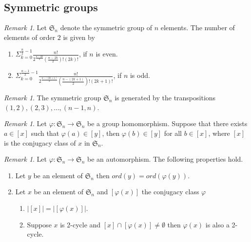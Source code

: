 \documentclass[oneside]{amsart}
\theoremstyle{plain}
\theoremstyle{definition}
\theoremstyle{remark}
\newtheorem{remark}[theorem]{Remark} %
\newcommand{\ord}{ord}
\begin{document}
    \subsection{Symmetric groups}    \begin{remark}\label{number_of_second_order_terms}
        Let $\mathfrak{S}_n$ denote the symmetric group of $n$ elements. The number of elements of order $2$ is given by
        \begin{enumerate}
            \item $\Sigma_{k = 0}^{\frac{n}{2} - 1} \frac{n!}{2^{\frac{n - 2k}{2}}\left(\frac{n - 2k}{2}\right)!\left(2k\right)!} $, if $n$ is even.
            \item $\Sigma_{k = 0}^{\frac{n - 1}{2} - 1} \frac{n!}{2^{\frac{n - (2k + 1)}{2}}\left(\frac{n - (2k + 1)}{2}\right)!\left(2k + 1\right)!}$, if $n$ is odd.
        \end{enumerate}
    \end{remark}
    \begin{remark}\label{s_n_generators}
        The symmetric group $\mathfrak{S}_n$ is generated by the transpositions $(1,2), (2,3), \ldots, (n - 1, n)$.
    \end{remark}
    \begin{remark}\label{homomorphism_preserves_conjugacy_class}
        Let $\varphi : \mathfrak{S}_n \to \mathfrak{S}_n$ be a group homomorphism. Suppose that there exists $a \in [x]$ such that $\varphi(a) \in [y]$, then $\varphi(b) \in [y]$ for all $b \in [x]$, where $[x]$ is the conjugacy class of $x$ in $\mathfrak{S}_n$.
    \end{remark}
    \begin{remark}\label{automorphism_properties_of_S_n}
     Let $\varphi : \mathfrak{S}_n\to\mathfrak{S}_n$ be an automorphism. The following properties hold.
        \begin{enumerate}
            \item  Let $y$ be an element of $\mathfrak{S}_n$ then $\ord (y) = \ord (\varphi(y))$.
            \item Let $x$ be an element of $\mathfrak{S}_n$ and $[\varphi(x)]$ the conjugacy class $\varphi$ 
            \begin{enumerate}
                \item $\big|[x]\big| = \big|[\varphi(x)]\big|$.
                \item Suppose $x$ is 2-cycle and $[x] \cap [\varphi(x)] \neq \emptyset$ then $\varphi(x)$ is also a 2-cycle.
            \end{enumerate}
        \end{enumerate}
    \end{remark}
\end{document}
